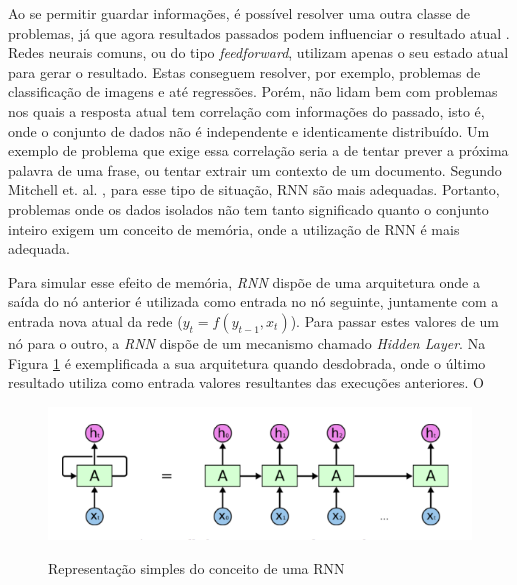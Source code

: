 Ao se permitir guardar informações, é possível resolver uma outra classe de problemas, já que agora resultados passados podem influenciar o resultado atual \cite{alex2012}. Redes neurais comuns, ou do tipo \textit{feedforward}, utilizam apenas o seu estado atual para gerar o resultado. Estas conseguem resolver, por exemplo, problemas de classificação de imagens e até regressões. Porém, não lidam bem com problemas nos quais a resposta atual tem correlação com informações do passado, isto é, onde o conjunto de dados não é independente e identicamente distribuído. Um exemplo de problema que exige essa correlação seria a de tentar prever a próxima palavra de uma frase, ou tentar extrair um contexto de um documento. Segundo Mitchell et. al. \cite{Mitchell_1997}, para esse tipo de situação, {\acrshort{RNN}} são mais adequadas. Portanto, problemas onde os dados isolados não tem tanto significado quanto o conjunto inteiro exigem um conceito de memória, onde a utilização de \acrshort{RNN} é mais adequada.

Para simular esse efeito de memória, \textit{\acrshort{RNN}} dispõe de uma arquitetura onde a saída do nó anterior é utilizada como entrada no nó seguinte, juntamente com a entrada nova atual da rede (\(y_t = f(y_{t-1}, x_t)\)). Para passar estes valores de um nó para o outro, a \textit{\acrshort{RNN}} dispõe de um mecanismo chamado \textit{Hidden Layer}. Na Figura \ref{figure:rnn} é exemplificada a sua arquitetura quando desdobrada, onde o último resultado utiliza como entrada valores resultantes das execuções anteriores. O

\begin{figure}[htbp]
    \centering
    \includegraphics[scale=0.4]{monography/img/models/rnnExample.png}
    \label{figure:rnn}
    \caption[Representação simples do conceito de um RNN]{Representação simples do conceito de uma RNN \footnotemark}
\end{figure}


